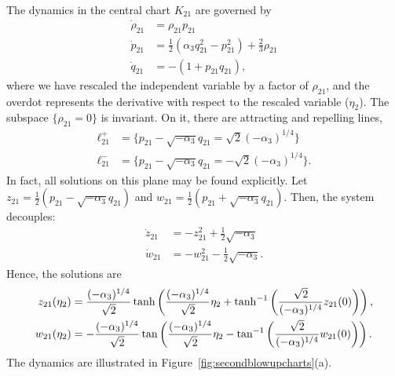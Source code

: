 \documentclass[11pt]{article}
\numberwithin{equation}{section}
\begin{document}
The dynamics in the central chart $K_{21}$ are governed by
\begin{equation}\label{eq:chartK21}
\begin{split}
    \dot{\rho}_{21} &= \rho_{21} p_{21}\\
    \dot{p}_{21} &= \tfrac12 (\alpha_3 q_{21}^2 - p_{21}^2) +\tfrac{2}{3}\rho_{21} \\
    \dot{q}_{21} &= -( 1 + p_{21}q_{21}),
\end{split}
    \end{equation}
where we have rescaled the independent variable by a factor of $\rho_{21}$, and the overdot represents the derivative with respect to the rescaled variable ($\eta_2$).
The subspace $\{ \rho_{21} =0 \}$ is invariant.
On it, there are attracting and repelling lines,
\begin{equation}
\begin{split} 
    \ell_{21}^+ &= \{ p_{21}- \sqrt{-\alpha_3} q_{21} = \sqrt{2}(-\alpha_3)^{1/4} \} \\
 \ell_{21}^- &= \{ p_{21}- \sqrt{-\alpha_3} q_{21} = - \sqrt{2}(-\alpha_3)^{1/4} \}.
    \end{split}
\end{equation}
In fact, all solutions on this plane may be found explicitly.
Let $z_{21}=\tfrac12 (p_{21} - \sqrt{-\alpha_3} q_{21})$ and 
$w_{21}=\tfrac12 (p_{21} + \sqrt{-\alpha_3} q_{21})$.
Then, the system decouples:
%
\begin{equation*}
   \begin{split}
       \dot{z}_{21} &=-z_{21}^2 + \tfrac{1}{2}\sqrt{-\alpha_3} \\
       \dot{w}_{21} &= -w_{21}^2 - \tfrac{1}{2}\sqrt{-\alpha_3}.
   \end{split}
\end{equation*}
%
Hence, the solutions are
\begin{equation*}
\begin{split}
z_{21}(\eta_{2})&= \frac{(-\alpha_3)^{1/4}}{\sqrt{2}} \tanh 
\left( \frac{(-\alpha_3)^{1/4}}{\sqrt{2}} \eta_2 + {\rm tanh}^{-1} \left( 
\frac{\sqrt{2}}{(-\alpha_3)^{1/4}} z_{21}(0) \right) \right), \\
w_{21}(\eta_{2})&= - \frac{(-\alpha_3)^{1/4}}{\sqrt{2}} \tan
\left( \frac{(-\alpha_3)^{1/4}}{\sqrt{2}} \eta_2 - {\rm tan}^{-1} \left( 
\frac{\sqrt{2}}{(-\alpha_3)^{1/4}} w_{21}(0) \right) \right).
\end{split}
\end{equation*}
The dynamics are illustrated in Figure~\ref{fig:secondblowupcharts}(a).
\end{document}

